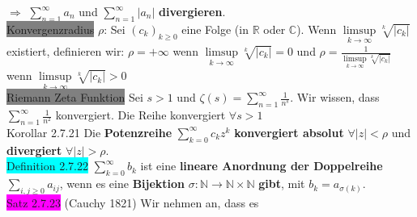 \documentclass[landscape, 10pt]{article}
\newcommand{\R}{\mathbb{R}}
\newcommand{\N}{\mathbb{N}}
\newcommand{\C}{\mathbb{C}}
\begin{document}
\begin{multicols}{3}
                            $\Longrightarrow$
                            \textcolor{NavyBlue}{$\sum_{n=1}^\infty a_n$} und 
                            \textcolor{NavyBlue}{$\sum_{n=1}^\infty |a_n|$}
                            \textbf{divergieren}.\\
              \colorbox{gray}{Konvergenzradius} \textcolor{NavyBlue}{$\rho$}: 
                     Sei \textcolor{NavyBlue}{$(c_k)_{k\geqslant0}$} eine Folge 
                     (in $\R$ oder $\C$). Wenn 
                     \textcolor{NavyBlue}{$\limsup\limits_{k\to\infty}\sqrt[k]{|c_k|}$} 
                     existiert, definieren wir: 
                     \textcolor{NavyBlue}{$\rho=+\infty$}
                     wenn \textcolor{NavyBlue}{
                     $\limsup\limits_{k\to\infty}\sqrt[k]{|c_k|}=0$}
                     und 
                     \textcolor{NavyBlue}{
                     $\rho=\frac{1}{\limsup\limits_{k\to\infty}\sqrt[k]{|c_k|}}$}
                     wenn 
                     \textcolor{NavyBlue}{
                     $\limsup\limits_{k\to\infty}\sqrt[k]{|c_k|} >0$}\\
              \colorbox{gray}{Riemann Zeta Funktion} Sei $s>1$ und 
                     $\zeta(s)=\sum_{n=1}^\infty\frac{1}{n^s}$.
                     Wir wissen, dass
                     $\sum_{n=1}^\infty\frac{1}{n^2}$ konvergiert.
                     Die Reihe 
                     konvergiert $\forall s>1$\\
              \colorbox{BurntOrange}{Korollar 2.7.21}
                     Die \textbf{Potenzreihe}
                     \textcolor{NavyBlue}{$\sum_{k=0}^\infty c_kz^k$}
                     \textbf{konvergiert absolut} 
                     \textcolor{NavyBlue}{$\forall |z|<\rho$} und \textbf{divergiert} 
                     \textcolor{NavyBlue}{$\forall |z|>\rho$}.\\
              \colorbox{cyan}{Definition 2.7.22} 
                     \textcolor{NavyBlue}{$\sum_{k=0}^\infty b_k$}
                     ist eine \textbf{lineare Anordnung der Doppelreihe} 
                     \textcolor{NavyBlue}{$\sum_{i,j\geqslant0}a_{ij}$}, 
                     wenn es eine 
                     \textbf{Bijektion} 
                     \textcolor{NavyBlue}{$\sigma:\N\longrightarrow\N\times\N$}
                     \textbf{gibt}, mit 
                     \textcolor{NavyBlue}{$b_k=a_{\sigma(k)}$}.\\
              \colorbox{magenta}{Satz 2.7.23} 
              (Cauchy 1821) 
                     Wir nehmen an, dass es 

\end{multicols}
\end{document}
